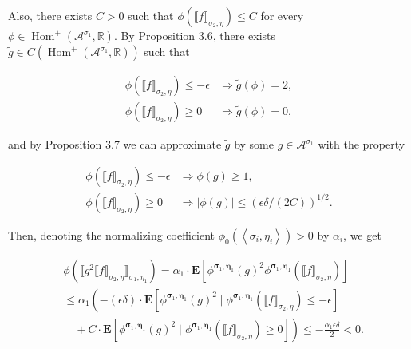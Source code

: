 \documentclass[10pt]{article}
\begin{document}
Also, there exists $C>0$ such that $\phi\left(\llbracket f \rrbracket_{\sigma_{2}, \eta}\right) \leq C$ for every $\phi \in \operatorname{Hom}^{+}\left(\mathcal{A}^{\sigma_{1}}, \mathbb{R}\right)$. By Proposition 3.6, there exists $\tilde{g} \in C\left(\operatorname{Hom}^{+}\left(\mathcal{A}^{\sigma_{1}}, \mathbb{R}\right)\right)$ such that

$$
\begin{aligned}
\phi\left(\llbracket f \rrbracket_{\sigma_{2}, \eta}\right) \leq-\epsilon & \Longrightarrow \tilde{g}(\phi)=2, \\
\phi\left(\llbracket f \rrbracket_{\sigma_{2}, \eta}\right) \geq 0 & \Longrightarrow \tilde{g}(\phi)=0,
\end{aligned}
$$

and by Proposition 3.7 we can approximate $\tilde{g}$ by some $g \in \mathcal{A}^{\sigma_{1}}$ with the property

$$
\begin{aligned}
\phi\left(\llbracket f \rrbracket_{\sigma_{2}, \eta}\right) \leq-\epsilon & \Longrightarrow \phi(g) \geq 1, \\
\phi\left(\llbracket f \rrbracket_{\sigma_{2}, \eta}\right) \geq 0 & \Longrightarrow|\phi(g)| \leq(\epsilon \delta /(2 C))^{1 / 2} .
\end{aligned}
$$

Then, denoting the normalizing coefficient $\phi_{0}\left(\left\langle\sigma_{i}, \eta_{i}\right\rangle\right)>0$ by $\alpha_{i}$, we get

$$
\begin{aligned}
& \phi\left(\llbracket g^{2} \llbracket f \rrbracket_{\sigma_{2}, \eta} \rrbracket_{\sigma_{1}, \eta_{1}}\right)=\alpha_{1} \cdot \mathbf{E}\left[\phi^{\boldsymbol{\sigma}_{1}, \boldsymbol{\eta}_{1}}(g)^{2} \phi^{\boldsymbol{\sigma}_{1}, \boldsymbol{\eta}_{1}}\left(\llbracket f \rrbracket_{\sigma_{2}, \eta}\right)\right] \\
& \leq \alpha_{1}\left(-(\epsilon \delta) \cdot \mathbf{E}\left[\phi^{\boldsymbol{\sigma}_{1}, \boldsymbol{\eta}_{1}}(g)^{2} \mid \phi^{\boldsymbol{\sigma}_{1}, \boldsymbol{\eta}_{1}}\left(\llbracket f \rrbracket_{\sigma_{2}, \eta}\right) \leq-\epsilon\right]\right. \\
& \left.\quad+C \cdot \mathbf{E}\left[\phi^{\boldsymbol{\sigma}_{1}, \boldsymbol{\eta}_{1}}(g)^{2} \mid \phi^{\boldsymbol{\sigma}_{1}, \boldsymbol{\eta}_{1}}\left(\llbracket f \rrbracket_{\sigma_{2}, \eta}\right) \geq 0\right]\right) \leq-\frac{\alpha_{1} \epsilon \delta}{2}<0 .
\end{aligned}
$$
\end{document}
